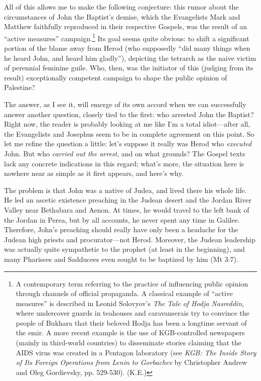 All of this allows me to make the following conjecture: this rumor about the circumstances of John the Baptist's demise, which the Evangelists Mark and Matthew faithfully reproduced in their respective Gospels, was the result of an ``active measures'' campaign.\footnote{A contemporary term referring to the practice of influencing public opinion through channels of official propaganda. A classical example of ``active measures'' is described in Leonid Solovyov's \emph{The Tale of Hodja Nasreddin}, where undercover guards in teahouses and caravanserais try to convince the people of Bukhara that their beloved Hodja has been a longtime servant of the emir. A more recent example is the use of KGB-controlled newspapers (mainly in third-world countries) to disseminate stories claiming that the AIDS virus was created in a Pentagon laboratory (see \emph{KGB: The Inside Story of Its Foreign Operations from Lenin to Gorbachev} by Christopher Andrew and Oleg Gordievsky, pp. 529-530). (K.E.)} Its goal seems quite obvious: to shift a significant portion of the blame away from Herod (who supposedly ``did many things when he heard John, and heard him gladly''), depicting the tetrarch as the naive victim of perennial feminine guile. Who, then, was the initiator of this (judging from its result) exceptionally competent campaign to shape the public opinion of Palestine?

The answer, as I see it, will emerge of its own accord when we can successfully answer another question, closely tied to the first: who arrested John the Baptist? Right now, the reader is probably looking at me like I'm a total idiot---after all, the Evangelists and Josephus seem to be in complete agreement on this point. So let me refine the question a little: let's suppose it really was Herod who \emph{executed} John. But who \emph{carried out the arrest}, and on what grounds? The Gospel texts lack any concrete indications in this regard; what's more, the situation here is nowhere near as simple as it first appears, and here's why.

The problem is that John was a native of Judea, and lived there his whole life. He led an ascetic existence preaching in the Judean desert and the Jordan River Valley near Bethabara and Aenon. At times, he would travel to the left bank of the Jordan in Perea, but by all accounts, he never spent any time in Galilee. Therefore, John's preaching should really have only been a headache for the Judean high priests and procurator---not Herod. Moreover, the Judean leadership was actually quite sympathetic to the prophet (at least in the beginning), and many Pharisees and Sadducees even sought to be baptized by him (Mt 3:7).

